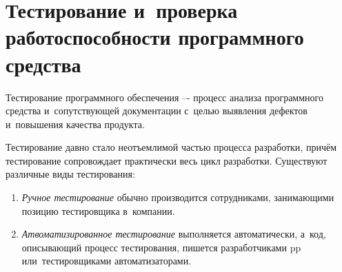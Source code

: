 \section{Тестирование и~проверка работоспособности программного средства}
\label{sec:testing}

Тестирование программного обеспечения –- процесс анализа программного средства и~сопутствующей документации с~целью выявления дефектов и~повышения качества продукта\cite{kulikov_testing}.

Тестирование давно стало неотъемлимой частью процесса разработки, причём тестирование сопровождает практически весь цикл разработки. Существуют различные виды тестирования:
\begin{enumerate}
	\item \textit{Ручное тестирование} обычно производится сотрудниками, занимающими позицию тестировщика в~компании.
	\item \textit{Атвоматизированное тестирование} выполняется автоматически, а~код, описывающий процесс тестирования, пишется разработчиками \gls{pp} или~тестировщиками автоматизаторами.
\end{enumerate}